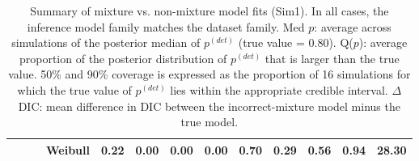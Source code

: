 \documentclass[useAMS,usenatbib,referee,12pt]{article}
\newcommand{\pdet}{p^{(det)}}
\begin{document}
\begin{table}[ht]
\begin{tabular}{l|l|l|l|cccc|cccc||r}
 & & &   Weibull & 0.22 & 0.00 & 0.00 & 0.00 & 0.70 & 0.29 & 0.56 & 0.94 & 28.30 \\ 
   \hline
\end{tabular}
\caption{Summary of mixture vs. non-mixture model fits (Sim1).  
In all cases, the inference model family matches the dataset family.  
Med $p$: average across simulations of the posterior median of $\pdet$ (true value = 0.80).  
Q($p$): average proportion of the posterior distribution of $\pdet$ that is larger than the true value.  
50\% and 90\% coverage is expressed as the proportion of 16 simulations for which the true value of $\pdet$ lies within the appropriate credible interval.  
$\Delta$ DIC: mean difference in DIC between the incorrect-mixture model minus the true model.
}
\label{tbl:sim1}
\end{table}

\else
\end{document}
